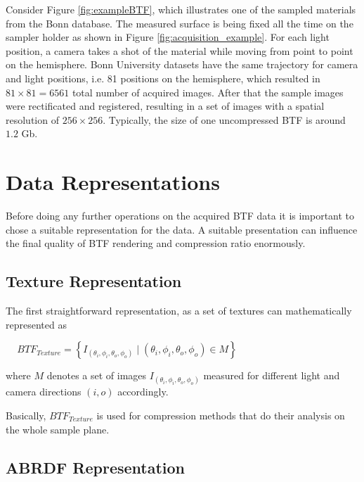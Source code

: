  Consider Figure \ref{fig:exampleBTF}, which illustrates one of the sampled materials from the Bonn database.
The measured surface is being fixed all the time on the sampler holder as shown in Figure \ref{fig:acquisition_example}. 
For each light position, a camera takes a shot of the material while moving from point to point on the hemisphere.
Bonn University datasets have the same trajectory for camera and light positions, i.e. 81 positions on the hemisphere, which resulted in $81\times81=6561$ total number of acquired images.
After that the sample images were rectificated and registered, resulting in a set of images with a spatial resolution of $256\times256$.
Typically, the size of one uncompressed BTF is around $1.2$ Gb.



\section{Data Representations}
\label{chapter:representations}




Before doing any further operations on the acquired BTF data it is important to chose a suitable representation for the data.
A suitable presentation can  influence the final quality of BTF rendering and compression ratio enormously.
\subsection{Texture Representation}
\label{chapter:texture_repr}

 The first straightforward representation, as a set of textures can mathematically represented as

{\centering $\,\,\,\,\,\,\,BTF_{Texture}=\left \{I_{(\theta_{i} ,\phi_{i},\theta_{o} ,\phi_{o}) }  \mid  (\theta_{i},\phi_{i},\theta_{o} ,\phi_{o})\in M \right \}$\\}


where $M$ denotes a set of images $I_{(\theta_{i} ,\phi_{i},\theta_{o} ,\phi_{o})}$ measured for different light and camera directions $(i,o)$ accordingly.

Basically, $BTF_{Texture}$ is used for compression methods that do their analysis on the whole sample plane.

\subsection{ABRDF Representation}
\label{chapter:abrdf_repr}

